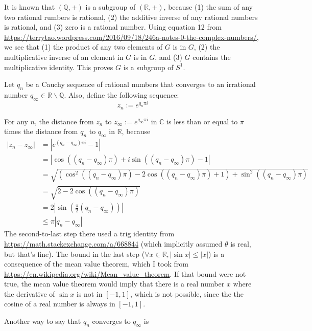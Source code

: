 \documentclass[12pt]{article}
\begin{document}
It is known that $(\mathbb{Q}, +)$ is a subgroup of $(\mathbb{R}, +)$, because (1) the sum of any two rational rumbers is rational, (2) the additive inverse of any rational numbers is rational, and (3) zero is a rational number. Using equation 12 from \url{https://terrytao.wordpress.com/2016/09/18/246a-notes-0-the-complex-numbers/}, we see that (1) the product of any two elements of $G$ is in $G$, (2) the multiplicative inverse of an element in $G$ is in $G$, and (3) $G$ contains the multiplicative identity. This proves $G$ is a subgroup of $S^1$.
\par
Let $q_n$ be a Cauchy sequence of rational numbers that converges to an irrational number $q_\infty \in \mathbb{R} \backslash \mathbb{Q}$. Also, define the following sequence:
\[ z_n := e^{q_n \pi i} \]
\par
For any $n$, the distance from $z_n$ to $z_\infty := e^{q_\infty \pi i}$ in $\mathbb{C}$ is less than or equal to $\pi$ times the distance from $q_n$ to $q_\infty$ in $\mathbb{R}$, because
\begin{align*}
    |z_n - z_\infty| &= |e^{(q_n - q_\infty) \pi i} - 1| \\
                                         &= |\cos((q_n - q_\infty) \pi) + i \sin((q_n - q_\infty) \pi) - 1| \\
                                         &= \sqrt{\left( \cos^2((q_n - q_\infty) \pi) - 2 \cos((q_n - q_\infty) \pi) + 1 \right) + \sin^2((q_n - q_\infty) \pi)} \\
                                         &= \sqrt{2 - 2 \cos((q_n - q_\infty) \pi)} \\
                                         &= 2 \left| \sin \left( \frac{\pi}{2} (q_n - q_\infty)\right) \right| \\
                                         &\leq \pi \left| q_n - q_\infty \right|
\end{align*}
The second-to-last step there used a trig identity from \url{https://math.stackexchange.com/a/668844} (which implicitly assumed $\theta$ is real, but that's fine). The bound in the last step ($\forall x \in \mathbb{R}, |\sin x| \leq |x|$) is a consequence of the mean value theorem, which I took from \url{https://en.wikipedia.org/wiki/Mean_value_theorem}. If that bound were not true, the mean value theorem would imply that there is a real number $x$ where the derivative of $\sin x$ is not in $[-1, 1]$, which is not possible, since the the cosine of a real number is always in $[-1, 1]$.
\par
Another way to say that $q_n$ converges to $q_\infty$ is
\end{document}
